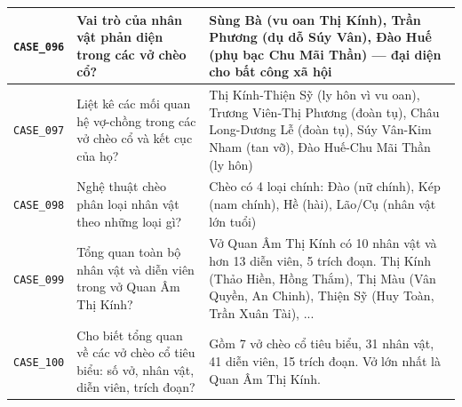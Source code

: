 \begin{longtable}{|p{1.9cm}|p{5.2cm}|p{7.3cm}|}
  \hline
  \texttt{CASE\_096} & Vai trò của nhân vật phản diện trong các vở chèo cổ? & Sùng Bà (vu oan Thị Kính), Trần Phương (dụ dỗ Súy Vân), Đào Huế (phụ bạc Chu Mãi Thần) — đại diện cho bất công xã hội \\
  \hline
  \texttt{CASE\_097} & Liệt kê các mối quan hệ vợ-chồng trong các vở chèo cổ và kết cục của họ? & Thị Kính-Thiện Sỹ (ly hôn vì vu oan), Trương Viên-Thị Phương (đoàn tụ), Châu Long-Dương Lễ (đoàn tụ), Súy Vân-Kim Nham (tan vỡ), Đào Huế-Chu Mãi Thần (ly hôn) \\
  \hline
  \texttt{CASE\_098} & Nghệ thuật chèo phân loại nhân vật theo những loại gì? & Chèo có 4 loại chính: Đào (nữ chính), Kép (nam chính), Hề (hài), Lão/Cụ (nhân vật lớn tuổi) \\
  \hline
  \texttt{CASE\_099} & Tổng quan toàn bộ nhân vật và diễn viên trong vở Quan Âm Thị Kính? & Vở Quan Âm Thị Kính có 10 nhân vật và hơn 13 diễn viên, 5 trích đoạn. Thị Kính (Thảo Hiền, Hồng Thắm), Thị Màu (Vân Quyền, An Chinh), Thiện Sỹ (Huy Toàn, Trần Xuân Tài), ... \\
  \hline
  \texttt{CASE\_100} & Cho biết tổng quan về các vở chèo cổ tiêu biểu: số vở, nhân vật, diễn viên, trích đoạn? & Gồm 7 vở chèo cổ tiêu biểu, 31 nhân vật, 41 diễn viên, 15 trích đoạn. Vở lớn nhất là Quan Âm Thị Kính. \\
  \hline
\end{longtable}
